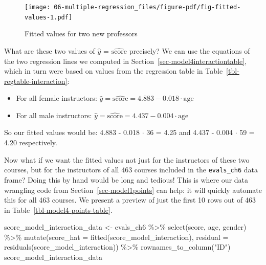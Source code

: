 \documentclass[
  letterpaper,
  DIV=11,
  numbers=noendperiod]{scrreprt}
\newenvironment{Shaded}{\begin{snugshade}}{\end{snugshade}}
\newcommand{\AttributeTok}[1]{\textcolor[rgb]{0.40,0.45,0.13}{#1}}
\newcommand{\FunctionTok}[1]{\textcolor[rgb]{0.28,0.35,0.67}{#1}}
\newcommand{\NormalTok}[1]{\textcolor[rgb]{0.00,0.23,0.31}{#1}}
\newcommand{\OtherTok}[1]{\textcolor[rgb]{0.00,0.23,0.31}{#1}}
\newcommand{\SpecialCharTok}[1]{\textcolor[rgb]{0.37,0.37,0.37}{#1}}
\newcommand{\StringTok}[1]{\textcolor[rgb]{0.13,0.47,0.30}{#1}}
\providecommand{\tightlist}{%
  \setlength{\itemsep}{0pt}\setlength{\parskip}{0pt}}\usepackage{longtable,booktabs,array}
\theoremstyle{definition}
\theoremstyle{remark}
\begin{document}
\begin{figure}

{\centering \texttt{[image: 06-multiple-regression\_files/figure-pdf/fig-fitted-values-1.pdf]}

}

\caption{\label{fig-fitted-values}Fitted values for two new professors}

\end{figure}

What are these two values of \(\widehat{y}\) =
\(\widehat{\text{score}}\) precisely? We can use the equations of the
two regression lines we computed in
Section~\ref{sec-model4interactiontable}, which in turn were based on
values from the regression table in
Table~\ref{tbl-regtable-interaction}:

\begin{itemize}
\tightlist
\item
  For all female instructors:
  \(\widehat{y} = \widehat{\text{score}} = 4.883 - 0.018 \cdot \mbox{age}\)
\item
  For all male instructors:
  \(\widehat{y} = \widehat{\text{score}} = 4.437 - 0.004 \cdot \mbox{age}\)
\end{itemize}

So our fitted values would be: 4.883 - 0.018 \(\cdot\) 36 = 4.25 and
4.437 - 0.004 \(\cdot\) 59 = 4.20 respectively.

Now what if we want the fitted values not just for the instructors of
these two courses, but for the instructors of all 463 courses included
in the \texttt{evals\_ch6} data frame? Doing this by hand would be long
and tedious! This is where our data wrangling code from
Section~\ref{sec-model1points} can help: it will quickly automate this
for all 463 courses. We present a preview of just the first 10 rows out
of 463 in Table~\ref{tbl-model4-points-table}.

\begin{Shaded}
\begin{Highlighting}[]
\NormalTok{score\_model\_interaction\_data }\OtherTok{\textless{}{-}}\NormalTok{ evals\_ch6 }\SpecialCharTok{\%\textgreater{}\%} 
  \FunctionTok{select}\NormalTok{(score, age, gender) }\SpecialCharTok{\%\textgreater{}\%} 
  \FunctionTok{mutate}\NormalTok{(}\AttributeTok{score\_hat =} \FunctionTok{fitted}\NormalTok{(score\_model\_interaction),}
         \AttributeTok{residual =} \FunctionTok{residuals}\NormalTok{(score\_model\_interaction)) }\SpecialCharTok{\%\textgreater{}\%} 
  \FunctionTok{rownames\_to\_column}\NormalTok{(}\StringTok{"ID"}\NormalTok{)}
\NormalTok{score\_model\_interaction\_data}
\end{Highlighting}
\end{Shaded}
\end{document}
